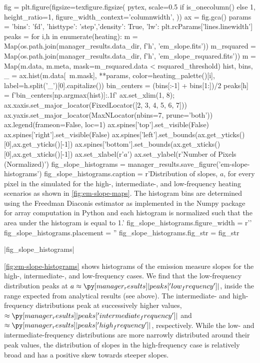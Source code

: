 \begin{pycode}
fig = plt.figure(figsize=texfigure.figsize(
    pytex,
    scale=0.5 if is_onecolumn() else 1,
    height_ratio=1,
    figure_width_context='columnwidth',
))
ax = fig.gca()
params = {'bins': 'fd', 'histtype': 'step','density': True, 
          'lw': plt.rcParams['lines.linewidth']}
peaks = {}
for i,h in enumerate(heating):
    m = Map(os.path.join(manager_results.data_dir, f'{h}', 'em_slope.fits'))
    m_rsquared = Map(os.path.join(manager_results.data_dir, f'{h}', 'em_slope_rsquared.fits'))
    m = Map(m.data, m.meta, mask=m_rsquared.data < rsquared_threshold)
    hist, bins, _ = ax.hist(m.data[~m.mask], **params, color=heating_palette()[i],
                         label=h.split('_')[0].capitalize())
    bin_centers = (bins[:-1] + bins[1:])/2
    peaks[h] = f'{bin_centers[np.argmax(hist)]:.1f}'
ax.set_xlim(1, 8);
ax.xaxis.set_major_locator(FixedLocator([2, 3, 4, 5, 6, 7]))
ax.yaxis.set_major_locator(MaxNLocator(nbins=7, prune='both'))
ax.legend(frameon=False, loc=1)
ax.spines['top'].set_visible(False)
ax.spines['right'].set_visible(False)
ax.spines['left'].set_bounds(ax.get_yticks()[0],ax.get_yticks()[-1])
ax.spines['bottom'].set_bounds(ax.get_xticks()[0],ax.get_xticks()[-1])
ax.set_xlabel(r'$a$')
ax.set_ylabel(r'Number of Pixels (Normalized)')
fig_slope_histograms = manager_results.save_figure('em-slope-histograms')
fig_slope_histograms.caption = r'Distribution of \dem{} slopes, $a$, for every pixel in the simulated \AR{} for the high-, intermediate-, and low-frequency heating scenarios as shown in \autoref{fig:em-slope-maps}. The histogram bins are determined using the Freedman Diaconis estimator \citep{freedman_histogram_1981} as implemented in the Numpy package for array computation in Python \citep{oliphant_guide_2006} and each histogram is normalized such that the area under the histogram is equal to 1.'
fig_slope_histograms.figure_width = r'\columnwidth'
fig_slope_histograms.placement = ''
fig_slope_histograms.fig_str = fig_str
\end{pycode}
|fig_slope_histograms|

\autoref{fig:em-slope-histograms} shows histograms of the emission measure slopes for the high-, intermediate-, and low-frequency cases. We find that the low-frequency distribution peaks at $a\approx\py[manager_results]|peaks['low_frequency']|$, inside the range expected from analytical results (see above). The intermediate- and high-frequency distributions peak at successively higher values, $\approx\py[manager_results]|peaks['intermediate_frequency']|$ and $\approx\py[manager_results]|peaks['high_frequency']|$, respectively. While the low- and intermediate-frequency distributions are more narrowly distributed around their peak values, the distribution of slopes in the high-frequency case is relatively broad and has a positive skew towards steeper slopes. 


